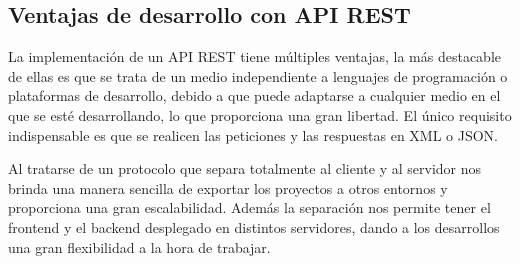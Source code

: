 \subsection{Ventajas de desarrollo con API REST}

La implementación de un API REST tiene múltiples ventajas, la más destacable de ellas es que se trata de un medio independiente a lenguajes de programación o plataformas de desarrollo, debido a que puede adaptarse a cualquier medio en el que se esté desarrollando, lo que proporciona una gran libertad. El único requisito indispensable es que se realicen las peticiones y las respuestas en XML o JSON. 

Al tratarse de un protocolo que separa totalmente al cliente y al servidor nos brinda una manera sencilla de exportar los proyectos a otros entornos y proporciona una gran escalabilidad. Además la separación nos permite tener el frontend y el backend desplegado en distintos servidores, dando a los desarrollos una gran flexibilidad a la hora de trabajar.


